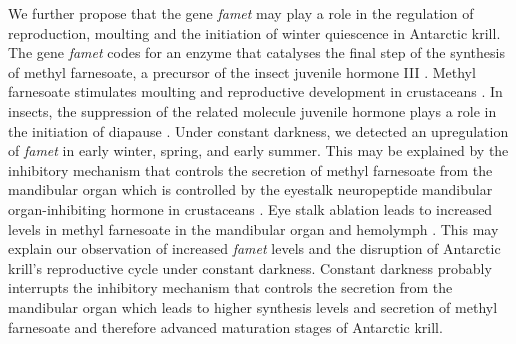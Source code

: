 We further propose that the gene \textit{famet} may play a role in the
regulation of reproduction, moulting and the initiation of winter quiescence in
Antarctic krill. The gene \textit{famet} codes for an enzyme that catalyses the
final step of the synthesis of methyl farnesoate, a precursor of the insect
juvenile hormone III \citep{gunawardene_function_2002}. Methyl farnesoate
stimulates moulting and reproductive development in crustaceans
\citep{reddy_involvement_2004}. In insects, the suppression of the related
molecule juvenile hormone plays a role in the initiation of diapause
\citep{liu_absence_2017}. Under constant darkness, we detected an upregulation
of \textit{famet} in early winter, spring, and early summer. This may be
explained by the inhibitory mechanism that controls the secretion of methyl
farnesoate from the mandibular organ which is controlled by the eyestalk
neuropeptide mandibular organ-inhibiting hormone in crustaceans
\citep{swetha_reproductive_2011}. Eye stalk ablation leads to increased levels
in methyl farnesoate in the mandibular organ and hemolymph
\citep{tsukimura_regulation_1992}. This may explain our observation of
increased \textit{famet} levels and the disruption of Antarctic krill's
reproductive cycle under constant darkness. Constant darkness probably
interrupts the inhibitory mechanism that controls the secretion from the
mandibular organ which leads to higher synthesis levels and secretion of methyl
farnesoate and therefore advanced maturation stages of Antarctic krill. 


